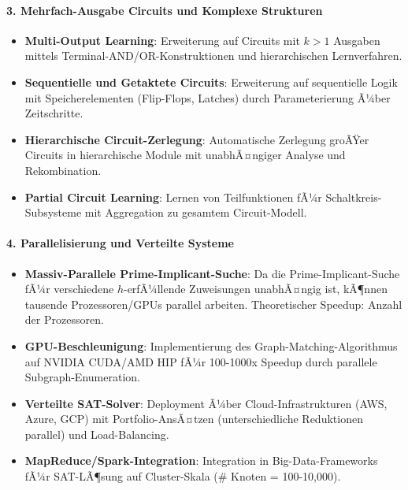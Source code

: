 ﻿\documentclass[a4paper,12pt]{article}
\theoremstyle{definition}
\begin{document}
\paragraph{3. Mehrfach-Ausgabe Circuits und Komplexe Strukturen}

\begin{itemize}
	\item \textbf{Multi-Output Learning}: Erweiterung auf Circuits mit $k > 1$ Ausgaben mittels Terminal-AND/OR-Konstruktionen und hierarchischen Lernverfahren.
	
	\item \textbf{Sequentielle und Getaktete Circuits}: Erweiterung auf sequentielle Logik mit Speicherelementen (Flip-Flops, Latches) durch Parameterierung Ã¼ber Zeitschritte.
	
	\item \textbf{Hierarchische Circuit-Zerlegung}: Automatische Zerlegung groÃŸer Circuits in hierarchische Module mit unabhÃ¤ngiger Analyse und Rekombination.
	
	\item \textbf{Partial Circuit Learning}: Lernen von Teilfunktionen fÃ¼r Schaltkreis-Subsysteme mit Aggregation zu gesamtem Circuit-Modell.
\end{itemize}

\paragraph{4. Parallelisierung und Verteilte Systeme}

\begin{itemize}
	\item \textbf{Massiv-Parallele Prime-Implicant-Suche}: Da die Prime-Implicant-Suche fÃ¼r verschiedene $h$-erfÃ¼llende Zuweisungen unabhÃ¤ngig ist, kÃ¶nnen tausende Prozessoren/GPUs parallel arbeiten. Theoretischer Speedup: Anzahl der Prozessoren.
	
	\item \textbf{GPU-Beschleunigung}: Implementierung des Graph-Matching-Algorithmus auf NVIDIA CUDA/AMD HIP fÃ¼r 100-1000x Speedup durch parallele Subgraph-Enume\-ration.
	
	\item \textbf{Verteilte SAT-Solver}: Deployment Ã¼ber Cloud-Infrastrukturen (AWS, Azure, GCP) mit Portfolio-AnsÃ¤tzen (unterschiedliche Reduktionen parallel) und Load-Balancing.
	
	\item \textbf{MapReduce/Spark-Integration}: Integration in Big-Data-Frameworks fÃ¼r SAT-LÃ¶sung auf Cluster-Skala (\# Knoten = 100-10,000).
\end{itemize}
\end{document}
